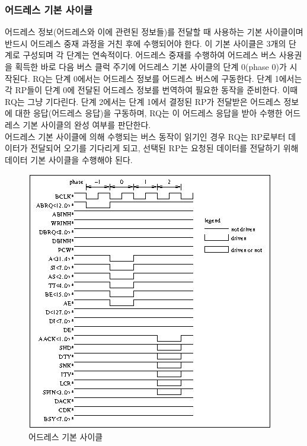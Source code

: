 \subsubsection{어드레스 기본 사이클}
어드레스 정보(어드레스와 이에 관련된 정보들)를 전달할 때 사용하는 기본 사이클이며
반드시 어드레스 중재 과정을 거친 후에
수행되어야 한다. 이 기본 사이클은 3개의 단계로 구성되며 각 단계는 연속적이다.
어드레스 중재를 수행하여 어드레스 버스 사용권을 획득한 바로 다음 버스 클럭 주기에 어드레스 기본 사이클의
단계 0(phase 0)가 시작된다. RQ는 단계 0에서는 어드레스 정보를
어드레스 버스에 구동한다. 단계 1에서는 각 RP들이 단계 0에 전달된 어드레스 정보를 번역하여
필요한 동작을 준비한다. 이때 RQ는 그냥 기다린다.
단계 2에서는 단계 1에서 결정된 RP가 전달받은 어드레스 정보에 대한 응답(어드레스 응답)을 구동하며,
RQ는 이 어드레스 응답을 받아 수행한 어드레스 기본 사이클의 완성 여부를 판단한다. \\
어드레스 기본 사이클에 의해 수행되는 버스 동작이 읽기인 경우 RQ는 RP로부터 데이터가
전달되어 오기를 기다리게 되고, 선택된 RP는 요청된 데이터를 전달하기 위해 데이터 기본 사이클을
수행해야 된다.
%
\begin{figure}[hp]
   \centerline{\includegraphics{ch3/FIG/single-add-basic.jpg}}
   \caption{어드레스 기본 사이클}\label{figure:single-add-basic}
\end{figure}
